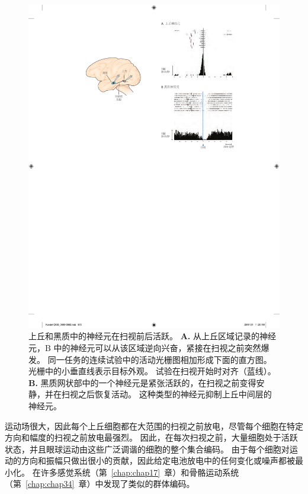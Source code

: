 \begin{figure}[htbp]
	\centering
	\includegraphics[width=0.96\linewidth]{chap35/fig_35_11}
	\caption{上丘和黑质中的神经元在扫视前后活跃\cite{hikosaka1989functional}。
		\textbf{A.} 从上丘区域记录的神经元，B 中的神经元可以从该区域逆向兴奋，紧接在扫视之前突然爆发。
		同一任务的连续试验中的活动光栅图相加形成下面的直方图。
		光栅中的小垂直线表示目标外观。
		试验在扫视开始时对齐（蓝线）。
		\textbf{B.} 黑质网状部中的一个神经元是紧张活跃的，在扫视之前变得安静，并在扫视之后恢复活动。
		这种类型的神经元抑制上丘中间层的神经元。}
	\label{fig:35_11}
\end{figure}


运动场很大，因此每个上丘细胞都在大范围的扫视之前放电，尽管每个细胞在特定方向和幅度的扫视之前放电最强烈。
因此，在每次扫视之前，大量细胞处于活跃状态，并且眼球运动由这些广泛调谐的细胞的整个集合编码。
由于每个细胞对运动的方向和振幅只做出很小的贡献，因此给定电池放电中的任何变化或噪声都被最小化。
在许多感觉系统（第~\ref{chap:chap17}~章）和骨骼运动系统（第~\ref{chap:chap34}~章）中发现了类似的群体编码。


